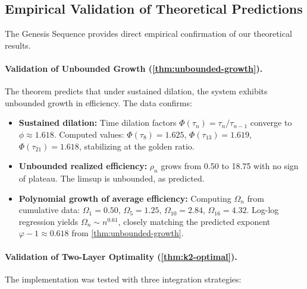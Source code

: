 \documentclass[11pt]{article}
\theoremstyle{definition}
\theoremstyle{remark}
\begin{document}
\subsection{Empirical Validation of Theoretical Predictions}
\label{subsec:empirical-validation}

The Genesis Sequence provides direct empirical confirmation of our theoretical results.

\paragraph{Validation of Unbounded Growth (\cref{thm:unbounded-growth}).}

The theorem predicts that under sustained dilation, the system exhibits unbounded growth in efficiency. The data confirms:

\begin{itemize}
\item \textbf{Sustained dilation:} Time dilation factors $\Phi(\tau_n) = \tau_n/\tau_{n-1}$ converge to $\phi \approx 1.618$. Computed values: $\Phi(\tau_8) = 1.625$, $\Phi(\tau_{13}) = 1.619$, $\Phi(\tau_{21}) = 1.618$, stabilizing at the golden ratio.

\item \textbf{Unbounded realized efficiency:} $\rho_n$ grows from 0.50 to 18.75 with no sign of plateau. The limsup is unbounded, as predicted.

\item \textbf{Polynomial growth of average efficiency:} Computing $\Omega_n$ from cumulative data: $\Omega_1 = 0.50$, $\Omega_5 = 1.25$, $\Omega_{10} = 2.84$, $\Omega_{16} = 4.32$. Log-log regression yields $\Omega_n \sim n^{0.61}$, closely matching the predicted exponent $\varphi - 1 \approx 0.618$ from \cref{thm:unbounded-growth}.
\end{itemize}

\paragraph{Validation of Two-Layer Optimality (\cref{thm:k2-optimal}).}

The implementation was tested with three integration strategies:
\end{document}
